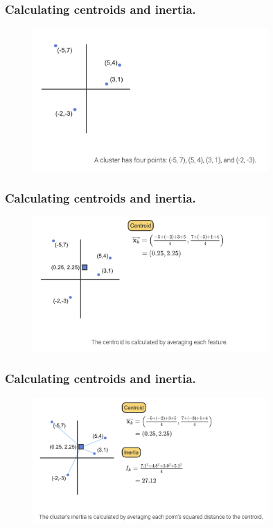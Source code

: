 \documentclass[10pt,dvipsnames]{beamer}
\begin{document}
\begin{frame}
    \frametitle{Calculating centroids and inertia.}
    \begin{figure}[ht]
        \centering
        \includegraphics[width=0.8\textwidth]{imgs/k_mean_6.png}
    \end{figure}
\end{frame}

\begin{frame}
    \frametitle{Calculating centroids and inertia.}
    \begin{figure}[ht]
        \centering
        \includegraphics[width=0.8\textwidth]{imgs/k_mean_7.png}
    \end{figure}
\end{frame}

\begin{frame}
    \frametitle{Calculating centroids and inertia.}
    \begin{figure}[ht]
        \centering
        \includegraphics[width=0.8\textwidth]{imgs/k_mean_8.png}
    \end{figure}
\end{frame}
\end{document}
